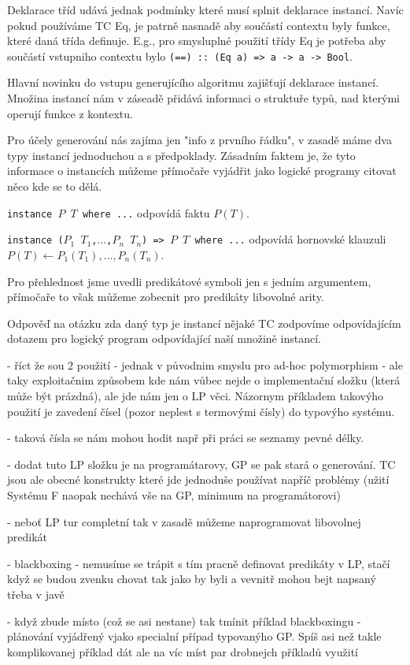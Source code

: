 \documentclass[11pt]{article}
\newcommand{\red}[1]{{\color{red} #1}}
\begin{document}
\begin{article}
Deklarace tříd udává jednak podmínky které musí splnit deklarace instancí. Navíc pokud používáme TC Eq, je patrně nasnadě aby součástí contextu byly funkce, které daná třída definuje. E.g., pro smysluplné použití třídy Eq je potřeba aby součástí vstupniho contextu bylo \texttt{(==) :: (Eq a) => a -> a -> Bool}. 

Hlavní novinku do vstupu generujícího algoritmu zajišťují deklarace instancí.  
Množina instancí nám  v záseadě přidává informaci o struktuře typů, nad kterými operují funkce z kontextu.

Pro účely generování nás zajíma jen "info z prvního řádku", v zasadě máme dva typy instancí jednoduchou a s předpoklady. Zásadním faktem je, že tyto informace o instancích můžeme přímočaře vyjádřit jako logické programy \red{citovat něco kde se to dělá}. 

\texttt{instance $P$ $T$ where ...} odpovídá faktu $P(T)$.

\texttt{instance ($P_1$ $T_1$,$\dots$,$P_n$ $T_n$) => $P$ $T$ where ...} odpovídá hornovské klauzuli $P(T) \leftarrow P_1(T_1),\dots,P_n(T_n)$.

Pro přehlednost jsme uvedli predikátové symboli jen s jedním argumentem, přímočaře to však můžeme zobecnit pro predikáty libovolné arity.

Odpověď na otázku zda daný typ je instancí nějaké TC zodpovíme odpovídajícím dotazem pro logický program odpovídající naší množině instancí.


\red{
- říct že sou 2 použití - jednak v původnim smyslu pro ad-hoc polymorphism - ale taky exploitačnim způsobem kde nám vůbec nejde o implementační složku (která může být prázdná), ale jde nám jen o LP věci. Názornym příkladem takovýho použití je zavedení čísel (pozor neplest s termovými čísly) do typovýho systému.

- taková čísla se nám mohou hodit např při práci se seznamy pevné délky.

- dodat tuto LP složku je na programátarovy, GP se pak stará o generování. 
  TC jsou ale obecné konstrukty které jde jednoduše používat napříč problémy
  (užití Systému F naopak nechává vše na GP, minimum na programátorovi) 

- neboť LP tur completní tak v zasadě můžeme naprogramovat libovolnej predikát

- blackboxing - nemusíme se trápit s tím pracně definovat predikáty v LP, stačí když se budou zvenku chovat tak jako by byli a vevnitř mohou bejt napsaný třeba v javě

- když zbude místo (což se asi nestane) tak tmínit příklad blackboxingu - plánování vyjádřený vjako specialní případ typovanýho GP. Spíš asi než takle komplikovanej příklad dát ale na víc míst par drobnejch příkladů využití

}
\end{article}
\end{document}
